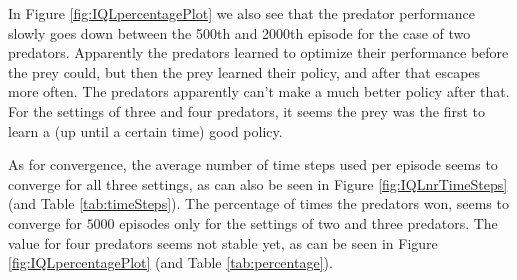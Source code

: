  In Figure \ref{fig:IQLpercentagePlot} we also see that the predator performance slowly goes down between the 500th and 2000th episode for the case of two predators. Apparently the predators learned to optimize their performance before the prey could, but then the prey learned their policy, and after that escapes more often. The predators apparently can't make a much better policy after that. For the settings of three and four predators, it seems the prey was the first to learn a (up until a certain time) good policy.
 
As for convergence, the average number of time steps used per episode seems to converge for all three settings, as can also be seen in Figure \ref{fig:IQLnrTimeSteps} (and Table \ref{tab:timeSteps}). The percentage of times the predators won, seems to converge for $5000$ episodes only for the settings of two and three predators. The value for four predators seems not stable yet, as can be seen in Figure \ref{fig:IQLpercentagePlot} (and Table \ref{tab:percentage}).


